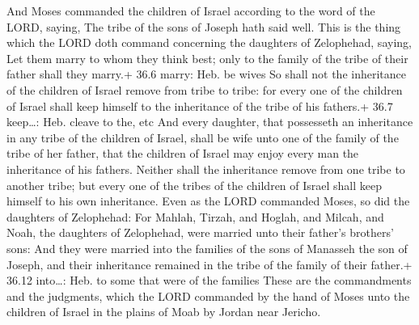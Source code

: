  And Moses commanded the children of Israel according to
the word of the LORD, saying, The tribe of the sons of Joseph hath said
well.  This is the thing which the LORD doth command
concerning the daughters of Zelophehad, saying, Let them marry to whom
they think best; only to the family of the tribe of their father shall
they marry.+ 36.6 marry: Heb. be wives  So shall not the
inheritance of the children of Israel remove from tribe to tribe: for
every one of the children of Israel shall keep himself to the
inheritance of the tribe of his fathers.+ 36.7 keep\ldots: Heb. cleave
to the, etc  And every daughter, that possesseth an
inheritance in any tribe of the children of Israel, shall be wife unto
one of the family of the tribe of her father, that the children of
Israel may enjoy every man the inheritance of his fathers.
 Neither shall the inheritance remove from one tribe to
another tribe; but every one of the tribes of the children of Israel
shall keep himself to his own inheritance.  Even as the
LORD commanded Moses, so did the daughters of Zelophehad:
 For Mahlah, Tirzah, and Hoglah, and Milcah, and Noah,
the daughters of Zelophehad, were married unto their father's brothers'
sons:  And they were married into the families of the
sons of Manasseh the son of Joseph, and their inheritance remained in
the tribe of the family of their father.+ 36.12 into\ldots: Heb. to some
that were of the families  These are the commandments and
the judgments, which the LORD commanded by the hand of Moses unto the
children of Israel in the plains of Moab by Jordan near Jericho.
